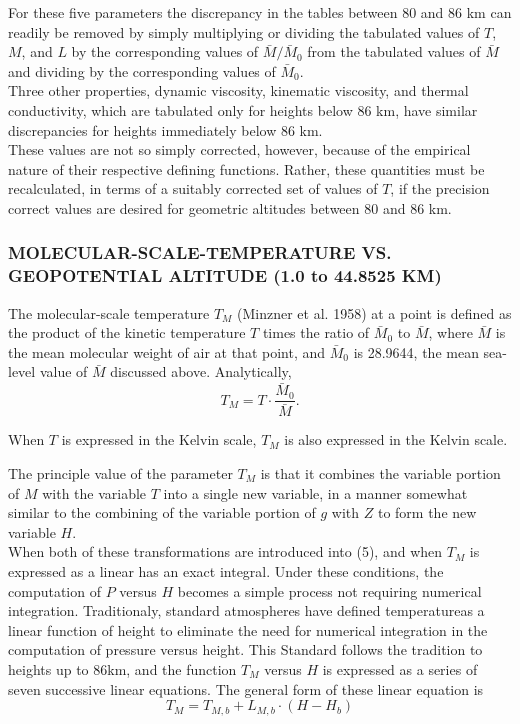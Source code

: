 \documentclass{article}
\begin{document}
For these five parameters the discrepancy in the tables between 80 and 86 km can readily be removed by simply multiplying or dividing the tabulated values of \(T\), \(M\), and \(L\) by the corresponding values of \(\bar{M} / \bar{M}_0\) from the tabulated values of \(\bar{M}\) and dividing by the corresponding values of \(\bar{M}_0\).\\

Three other properties, dynamic viscosity, kinematic viscosity, and thermal conductivity, which are tabulated only for heights below 86 km, have similar discrepancies for heights immediately below 86 km.\\

These values are not so simply corrected, however, because of the empirical nature of their respective defining functions. Rather, these quantities must be recalculated, in terms of a suitably corrected set of values of \(T\), if the precision correct values are desired for geometric altitudes between 80 and 86 km.\\

\subsubsection{MOLECULAR-SCALE-TEMPERATURE VS. GEOPOTENTIAL ALTITUDE (1.0 to 44.8525 KM)}

The molecular-scale temperature \(T_M\) (Minzner et al. 1958) at a point is defined as the product of the kinetic temperature \(T\) times the ratio of \(\bar{M}_0\) to \(\bar{M}\), where \(\bar{M}\) is the mean molecular weight of air at that point, and \(\bar{M}_0\) is 28.9644, the mean sea-level value of \(\bar{M}\) discussed above. Analytically,
\begin{equation}
  T_M = T \cdot \frac{\bar{M}_0}{\bar{M}}. \tag{22}
\end{equation}

When \(T\) is expressed in the Kelvin scale, \(T_M\) is also expressed in the Kelvin scale.

The principle value of the parameter \(T_M\) is that it combines the variable portion of \(M\) with the variable \(T\) into a single new variable, in a manner somewhat similar to the combining of the variable portion of \(g\) with \(Z\) to form the new variable \(H\).\\
When both of these transformations are introduced into (5), and when \(T_M\) is expressed as a linear has an exact integral. Under these conditions, the computation of \(P\) versus \(H\) becomes a simple process not requiring numerical integration. Traditionaly, standard atmospheres have defined temperatureas a linear function of height to eliminate the need for numerical integration in the computation of pressure versus height. This Standard follows the tradition to heights up to 86km, and the function \(T_M\) versus \(H\) is expressed as a series of seven successive linear equations. The general form of these linear equation is 
\begin{equation}
  T_M = T_{M,b} + L_{M,b}\cdot (H - H_b) 
  \tag{23}
\end{equation}
\end{document}
